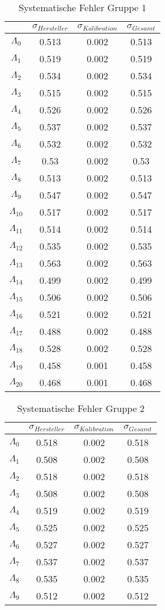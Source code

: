 \documentclass{article}
\begin{document}
\begin{table}[H]\centering
\caption{Systematische Fehler Gruppe 1}
\begin{tabular}{c|c|c|c}
 &$\sigma_{Hersteller}$&$\sigma_{Kalibration}$&$\sigma_{Gesamt}$\\
\hline
$\Lambda_0$&0.513&0.002&0.513\\
$\Lambda_1$&0.519&0.002&0.519\\
$\Lambda_2$&0.534&0.002&0.534\\
$\Lambda_3$&0.515&0.002&0.515\\
$\Lambda_4$&0.526&0.002&0.526\\
$\Lambda_5$&0.537&0.002&0.537\\
$\Lambda_6$&0.532&0.002&0.532\\
$\Lambda_7$&0.53&0.002&0.53\\
$\Lambda_8$&0.513&0.002&0.513\\
$\Lambda_9$&0.547&0.002&0.547\\
$\Lambda_{10}$&0.517&0.002&0.517\\
$\Lambda_{11}$&0.514&0.002&0.514\\
$\Lambda_{12}$&0.535&0.002&0.535\\
$\Lambda_{13}$&0.563&0.002&0.563\\
$\Lambda_{14}$&0.499&0.002&0.499\\
$\Lambda_{15}$&0.506&0.002&0.506\\
$\Lambda_{16}$&0.521&0.002&0.521\\
$\Lambda_{17}$&0.488&0.002&0.488\\
$\Lambda_{18}$&0.528&0.002&0.528\\
$\Lambda_{19}$&0.458&0.001&0.458\\
$\Lambda_{20}$&0.468&0.001&0.468\\
\end{tabular}
\end{table}
\begin{table}[H]\centering
\caption{Systematische Fehler Gruppe 2}
\begin{tabular}{c|c|c|c}
 &$\sigma_{Hersteller}$&$\sigma_{Kalibration}$&$\sigma_{Gesamt}$\\
\hline
$\Lambda_0$&0.518&0.002&0.518\\
$\Lambda_1$&0.508&0.002&0.508\\
$\Lambda_2$&0.518&0.002&0.518\\
$\Lambda_3$&0.508&0.002&0.508\\
$\Lambda_4$&0.519&0.002&0.519\\
$\Lambda_5$&0.525&0.002&0.525\\
$\Lambda_6$&0.527&0.002&0.527\\
$\Lambda_7$&0.537&0.002&0.537\\
$\Lambda_8$&0.535&0.002&0.535\\
$\Lambda_9$&0.512&0.002&0.512\\
\end{tabular}
\end{table}
\end{document}
